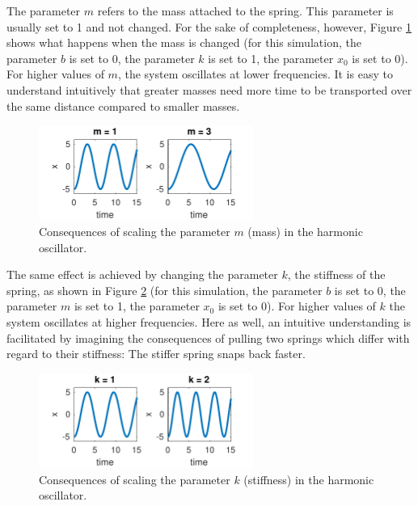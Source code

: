 The parameter $m$ refers to the mass attached to the spring. This parameter is usually set to 1 and not changed. For the sake of completeness, however, Figure \ref{fig:dho_mass}  shows what happens when the mass is changed (for this simulation, the parameter $b$ is set to 0, the parameter $k$ is set to 1, the parameter $x_0$ is set to 0). For higher values of $m$, the system oscillates at lower frequencies. It is easy to understand intuitively that greater masses need more time to be transported over the same distance compared to smaller masses. 

\begin{figure}[t]
\includegraphics[width=7cm]{figures/ch3/dho_mass.pdf}
\caption{Consequences of scaling the parameter $m$ (mass) in the harmonic oscillator.}
\label{fig:dho_mass}
\end{figure}

The same effect is achieved by changing the parameter $k$, the stiffness of the spring, as shown in Figure \ref{fig:dho_stiff} (for this simulation, the parameter $b$ is set to 0, the parameter $m$ is set to 1, the parameter $x_0$ is set to 0). For higher values of $k$ the system oscillates at higher frequencies. Here as well, an intuitive understanding is facilitated by imagining the consequences of pulling two springs which differ with regard to their stiffness: The stiffer spring snaps back faster.

\begin{figure}
\includegraphics[width=7cm]{figures/ch3/dho_stiffness.pdf}
\caption{Consequences of scaling the parameter $k$ (stiffness) in the harmonic oscillator.}
\label{fig:dho_stiff}
\end{figure}

